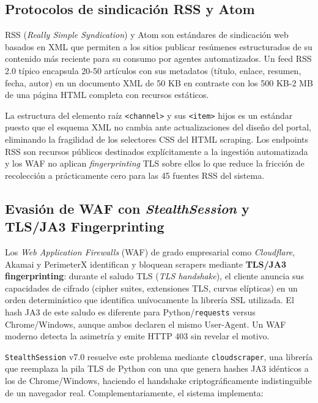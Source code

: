 \subsection{Protocolos de sindicación RSS y Atom}
\label{subsec:mt_rss}

RSS (\textit{Really Simple Syndication}) y Atom son estándares de sindicación web
basados en XML que permiten a los sitios publicar resúmenes estructurados de su
contenido más reciente para su consumo por agentes automatizados. Un feed RSS 2.0
típico encapsula 20-50 artículos con sus metadatos (título, enlace, resumen, fecha,
autor) en un documento XML de 50 KB en contraste con los 500 KB-2 MB de una página
HTML completa con recursos estáticos.

La estructura del elemento raíz \texttt{<channel>} y sus \texttt{<item>} hijos
es un estándar puesto que el esquema XML no cambia ante actualizaciones del diseño
del portal, eliminando la fragilidad de los selectores CSS del HTML scraping.
Los endpoints RSS son recursos públicos destinados explícitamente a la ingestión
automatizada y los WAF no aplican \textit{fingerprinting} TLS sobre ellos lo que reduce
la fricción de recolección a prácticamente cero para las 45 fuentes RSS del sistema.

\subsection{Evasión de WAF con \textit{StealthSession} y TLS/JA3 Fingerprinting}
\label{subsec:mt_stealth}

Los \textit{Web Application Firewalls} (WAF) de grado empresarial como \textit{Cloudflare},
Akamai y PerimeterX identifican y bloquean scrapers mediante \textbf{TLS/JA3
fingerprinting}: durante el saludo TLS (\textit{TLS handshake}), el cliente anuncia
sus capacidades de cifrado (cipher suites, extensiones TLS, curvas elípticas)
en un orden determinístico que identifica unívocamente la librería SSL utilizada.
El hash JA3 de este saludo es diferente para Python/\texttt{requests} versus
Chrome/Windows, aunque ambos declaren el mismo User-Agent. Un WAF moderno detecta
la asimetría y emite HTTP 403 sin revelar el motivo.

\texttt{StealthSession} v7.0 resuelve este problema mediante \texttt{cloudscraper},
una librería que reemplaza la pila TLS de Python con una que genera hashes JA3
idénticos a los de Chrome/Windows, haciendo el handshake criptográficamente
indistinguible de un navegador real. Complementariamente, el sistema implementa:

